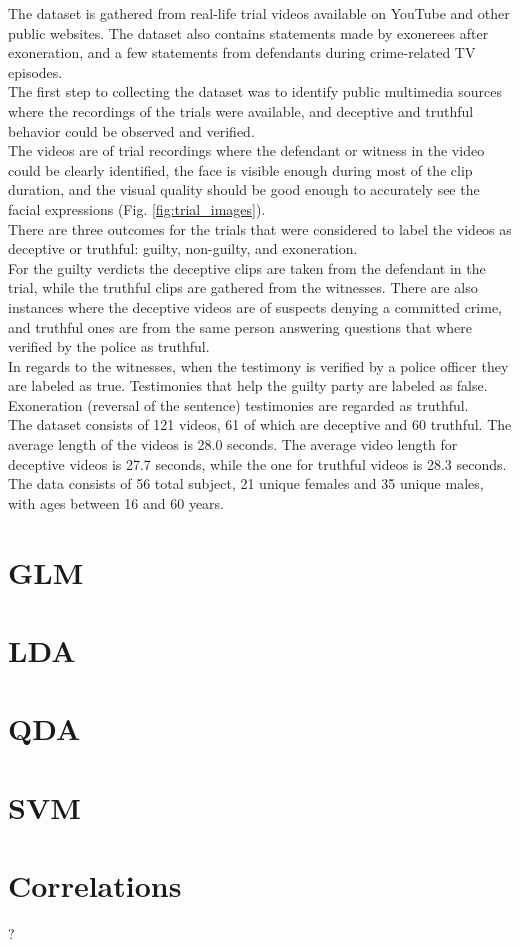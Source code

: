 The dataset is gathered from real-life trial videos available on YouTube and other public websites. The dataset also contains statements made by exonerees after exoneration, and a few statements from defendants during crime-related TV episodes. \\
The first step to collecting the dataset was to identify public multimedia sources where the recordings of the trials were available, and deceptive and truthful behavior could be observed and verified.\\
The videos are of trial recordings where the defendant or witness in the video could be clearly identified, the face is visible enough during most of the clip duration, and the visual quality should be good enough to accurately see the facial expressions (Fig. \ref{fig:trial_images}).\\
There are three outcomes for the trials that were considered to label the videos as deceptive or truthful: guilty, non-guilty, and exoneration. \\
For the guilty verdicts the deceptive clips are taken from the defendant in the trial, while the truthful clips are gathered from the witnesses. There are also instances where the deceptive videos are of suspects denying a committed crime, and truthful ones are from the same person answering questions that where verified by the police as truthful.\\
In regards to the witnesses, when the testimony is verified by a police officer they are labeled as true. Testimonies that help the guilty party are labeled as false. Exoneration (reversal of the sentence) testimonies are regarded as truthful.\\

The dataset consists of 121 videos, 61 of which are deceptive and 60 truthful. The average length of the videos is 28.0 seconds. The average video length for deceptive videos is 27.7 seconds, while the one for truthful videos is 28.3 seconds. The data consists of 56 total subject, 21 unique females and 35 unique males, with ages between 16 and 60 years.

\section{GLM}

\section{LDA}

\section{QDA}

\section{SVM}

\section{Correlations} ?